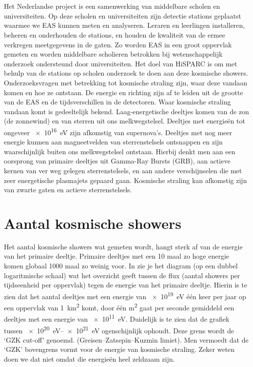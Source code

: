 \section{\hisparc}

Het Nederlandse project \hisparc is een samenwerking van middelbare scholen en universiteiten.
Op deze scholen en universiteiten zijn detectie stations geplaatst waarmee we EAS kunnen
meten en analyseren. Leraren en leerlingen installeren, beheren en onderhouden de stations,
en houden de kwaliteit van de ermee verkregen meetgegevens in de gaten.
Zo worden EAS in een groot oppervlak gemeten en worden middelbare
scholieren betrokken bij wetenschappelijk onderzoek ondersteund door
universiteiten. Het doel van HiSPARC is om met behulp van de stations op
scholen onderzoek te doen aan deze kosmische showers. Onderzoeksvragen
met betrekking tot kosmische straling zijn, waar deze vandaan komen en
hoe ze ontstaan. De energie en richting zijn af te leiden uit de grootte
van de EAS en de tijdsverschillen in de detectoren. Waar kosmische
straling vandaan komt is gedeeltelijk bekend. Laag-energetische deeltjes
komen van de zon (de zonnewind) en van sterren uit ons melkwegstelsel.
Deeltjes met energieën tot ongeveer \SI{e16}{\electronvolt} zijn
afkomstig van supernova's. Deeltjes met nog meer energie kunnen aan
magneetvelden van sterrenstelsels ontsnappen en zijn waarschijnlijk
buiten ons melkwegstelsel ontstaan. Hierbij denkt men aan een oorsprong
van primaire deeltjes uit Gamma-Ray Bursts (GRB), aan actieve kernen van
ver weg gelegen sterrenstelsels, en aan andere verschijnselen die met
zeer energetische plasmajets gepaard gaan. Kosmische straling kan
afkomstig zijn van zwarte gaten en actieve sterrenstelsels.

\section{Aantal kosmische showers}

Het aantal kosmische showers wat gemeten wordt, hangt sterk af van de
energie van het primaire deeltje. Primaire deeltjes met een 10 maal zo
hoge energie komen globaal 1000 maal zo weinig voor. In
 zie je het diagram (op een dubbel
logaritmische schaal) wat het overzicht geeft tussen de flux (aantal
showers per tijdseenheid per oppervlak) tegen de energie van het
primaire deeltje. Hierin is te zien dat het aantal deeltjes met een
energie van \SI{e19}{\electronvolt} één keer per jaar op een oppervlak
van \SI{1}{\square\kilo\meter} komt, door één \si{\square\meter} gaat
per seconde gemiddeld een deeltjes met een energie van
\SI{e11}{\electronvolt}. Duidelijk is te zien dat de grafiek tussen
\SIrange{e20}{e21}{\electronvolt} ogenschijnlijk ophoudt. Deze grens
wordt de ‘GZK cut-off’ genoemd. (Greisen–Zatsepin–Kuzmin limiet). Men
vermoedt dat de ‘GZK’ bovengrens vormt voor de energie van kosmische
straling. Zeker weten doen we dat niet omdat die energieën heel zeldzaam
zijn.

